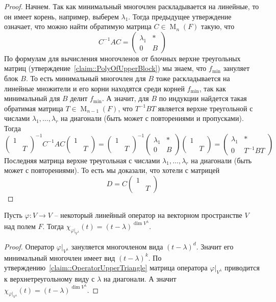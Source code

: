 \begin{proof}
Начнем.
Так как минимальный многочлен раскладывается на линейные, то он имеет корень, например, выберем $\lambda_1$.
Тогда предыдущее утверждение означает, что можно найти обратимую матрица $C\in \operatorname{M}_n(F)$ такую, что
\[
C^{-1}AC =
\begin{pmatrix}
{\lambda_1}&{*}\\
{0}&{B}
\end{pmatrix}
\]
По формулам для вычисления многочленов от блочных верхне треугольных матриц (утверждение~\ref{claim::PolyOfUpperBlock}) мы знаем, что $f_\text{min}$ зануляет блок $B$.
То есть минимальный многочлен для $B$ тоже раскладывается на линейные множители и его корни находятся среди корней $f_\text{min}$, так как минимальный для $B$ делит $f_\text{min}$.
А значит, для $B$ по индукции найдется такая обратимая матрица $T\in \operatorname{M}_{n-1}(F)$, что $T^{-1}BT$ является верхне треугольной с числами $\lambda_1,\ldots,\lambda_r$ на диагонали (быть может с повторениями и пропусками).
Тогда
\[
\begin{pmatrix}
{1}&{}\\
{}&{T}
\end{pmatrix}^{-1}
C^{-1}AC
\begin{pmatrix}
{1}&{}\\
{}&{T}
\end{pmatrix}
=
\begin{pmatrix}
{1}&{}\\
{}&{T}
\end{pmatrix}^{-1}
\begin{pmatrix}
{\lambda_1}&{*}\\
{0}&{B}
\end{pmatrix}
\begin{pmatrix}
{1}&{}\\
{}&{T}
\end{pmatrix}=
\begin{pmatrix}
{\lambda_1}&{*}\\
{0}&{T^{-1}BT}
\end{pmatrix}
\]
Последняя матрица верхне треугольная с числами $\lambda_1,\ldots,\lambda_r$ на диагонали (быть может с повторениями).
То есть мы доказали, что хотели с матрицей
\[
D = C 
\begin{pmatrix}
{1}&{}\\
{}&{T}
\end{pmatrix}
\]
\end{proof}

\begin{claim}
\label{claim::CharPolyOnRootSpace}
Пусть $\varphi\colon V\to V$ -- некоторый линейный оператор на векторном пространстве $V$ над полем $F$.
Тогда $\chi_{\varphi|_{V^\lambda}} (t) = (t - \lambda)^{\dim V^\lambda}$.
\end{claim}
\begin{proof}
Оператор $\varphi|_{V^\lambda}$ зануляется многочленом вида $(t-\lambda)^d$.
Значит его минимальный многочлен имеет вид $(t-\lambda)^k$.
По утверждению~\ref{claim::OperatorUpperTriangle} матрица оператора $\varphi|_{V^\lambda}$ приводится к верхнетреугольному виду с $\lambda$ на диагонали.
А значит $\chi_{\varphi|_{V^\lambda}}(t) = (t - \lambda)^{\dim V^{\lambda}}$.
\end{proof}

